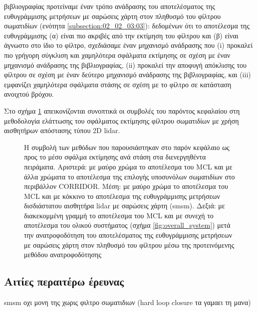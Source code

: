 \begin{itemize}
        βιβλιογραφίας προτείναμε έναν τρόπο ανάδρασης του αποτελέσματος της
        ευθυγράμμισης μετρήσεων με σαρώσεις χάρτη στον πληθυσμό του φίλτρου
        σωματιδίων (ενότητα \ref{subsection:02_02_03:03}): δεδομένων ότι το
        αποτέλεσμα της ευθυγράμμισης (α) είναι πιο ακριβές από την εκτίμηση του
        φίλτρου και (β) είναι άγνωστο στο ίδιο το φίλτρο, σχεδιάσαμε έναν
        μηχανισμό ανάδρασης που (i) προκαλεί πιο γρήγορη σύγκλιση και
        χαμηλότερα σφάλματα εκτίμησης σε σχέση με έναν μηχανισμό ανάδρασης της
        βιβλιογραφίας, (ii) προκαλεί την αποφυγή απόκλισης του φίλτρου σε σχέση
        με έναν δεύτερο μηχανισμό ανάδρασης της βιβλιογραφίας, και (iii)
        εμφανίζει χαμηλότερα σφάλματα στάσης σε σχέση με το φίλτρο σε κατάσταση
        ανοιχτού βρόχου.
\end{itemize}

Στο σχήμα \ref{fig:02_02_05:01} απεικονίζονται συνοπτικά οι συμβολές του
παρόντος κεφαλαίου στη μεθοδολογία ελάττωσης του σφάλματος εκτίμησης φίλτρου
σωματιδίων με χρήση αισθητήρων απόστασης τύπου 2D lidar.



\begin{figure}
  \hspace{-1cm}
  
  \vspace{1cm}
  \caption{\small Η συμβολή των μεθόδων που παρουσιάστηκαν στο παρόν κεφάλαιο
           ως προς το μέσο σφάλμα εκτίμησης ανά στάση στα διενεργηθέντα
           πειράματα. Αριστερά: με μαύρο χρώμα το αποτέλεσμα του MCL και με άλλα
           χρώματα το αποτέλεσμα της επιλογής υποσυνόλων σωματιδίων στο
           περιβάλλον CORRIDOR. Μέση: με μαύρο χρώμα το αποτέλεσμα του MCL και
           με κόκκινο το αποτέλεσμα της ευθυγράμμισης μετρήσεων δισδιάστατου
           αισθητήρα lidar με σαρώσεις χάρτη (smsm). Δεξιά: με διακεκομμένη
           γραμμή το αποτέλεσμα του MCL και με συνεχή το αποτέλεσμα του ολικού
           συστήματος (σχήμα \ref{fig:overall_system}) μετά την ανατροφοδότηση
           του αποτελέσματος της ευθυγράμμισης μετρήσεων με σαρώσεις χάρτη
           στον πληθυσμό του φίλτρου μέσω της προτεινόμενης μεθόδου
           ανατροφοδότησης}
  \label{fig:02_02_05:01}
\end{figure}


\subsection{Αιτίες περαιτέρω έρευνας}


smsm οχι μονη της χωρις φιλτρο σωματιδιων (hard loop closure τα γαμαει τη μανα)
